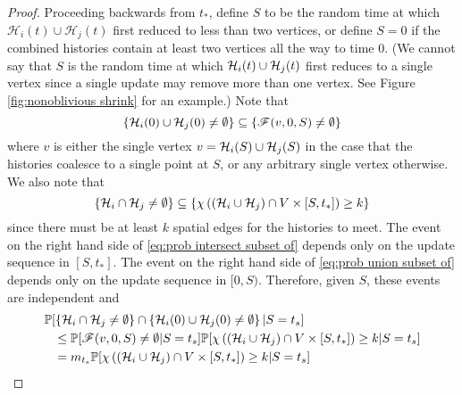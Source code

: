 \begin{proof}
		Proceeding backwards from $t_*$, define $S$ to be the random time at which $\mathcal{H}_i(t) \cup \mathcal{H}_j(t)$ first reduced to less than two vertices, or define $S = 0$ if the combined histories contain at least two vertices all the way to time $0$. (We cannot say that $S$ is the random time at which $\mathcal{H}_i(t) \cup \mathcal{H}_j(t)$ first reduces to a single vertex since a single update may remove more than one vertex. See Figure \ref{fig:nonoblivious shrink} for an example.)
		Note that
		\begin{equation}
			\label{eq:prob union subset of}
			\{\mathcal{H}_i(0) \cup \mathcal{H}_j(0) \neq \emptyset\} \subseteq \{\mathscr{F}(v, 0, S) \neq \emptyset\}
		\end{equation}
		where $v$ is either the single vertex $v = \mathcal{H}_i(S) \cup\mathcal{H}_j(S)$ in the case that the histories coalesce to a single point at $S$, or any arbitrary single vertex otherwise.
		We also note that
		\begin{equation}
			\label{eq:prob intersect subset of}
			\{\mathcal{H}_i \cap \mathcal{H}_j \neq \emptyset\} \subseteq \{\chi\left((\mathcal{H}_i \cup \mathcal{H}_j)\cap V \times [S, t_*]\right) \geq k \}
		\end{equation}
		since there must be at least $k$ spatial edges for the histories to meet. The event on the right hand side of \eqref{eq:prob intersect subset of} depends only on the update sequence in $[S, t_*]$. The event on the right hand side of \eqref{eq:prob union subset of} depends only on the update sequence in $[0, S)$. Therefore, given $S$, these events are independent and
		\begin{align}
			&\prob[\left\{\mathcal{H}_i \cap \mathcal{H}_j \neq \emptyset\right\} \cap \left\{\mathcal{H}_i(0) \cup \mathcal{H}_j(0) \neq \emptyset\right\}| S = t_s] \notag \\
			&\phantom{=}\leq \prob[\mathscr{F}(v, 0, S) \neq \emptyset | S = t_s] \prob[\chi\left((\hist_i \cup \hist_j)\cap V \times [S, t_*]\right) \geq k | S = t_s]\\
			&\phantom{=}= m_{t_s}  \prob[\chi\left((\hist_i \cup \hist_j)\cap V \times [S, t_*]\right) \geq k  | S = t_s]

\end{align}
\end{proof}
